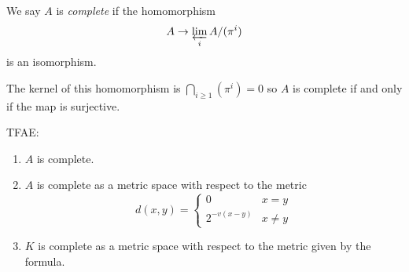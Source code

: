 \documentclass[a4paper]{article}
\begin{document}
\begin{definition}[complete]
  We say \(A\) is \emph{complete} if the homomorphism
  \[
    A \to \varprojlim_i A/(\pi^i)
  \]
  is an isomorphism.
\end{definition}

The kernel of this homomorphism is \(\bigcap_{i \geq 1} (\pi^i) = 0\) so \(A\) is complete if and only if the map is surjective.

\begin{lemma}
  TFAE:
  \begin{enumerate}
  \item \(A\) is complete.
  \item \(A\) is complete as a metric space with respect to the metric
    \[
      d(x, y) =
      \begin{cases}
        0 & x = y \\
        2^{-v(x - y)} & x \neq y
      \end{cases}
    \]
  \item \(K\) is complete as a metric space with respect to the metric given by the formula.
  \end{enumerate}
\end{lemma}
\end{document}
